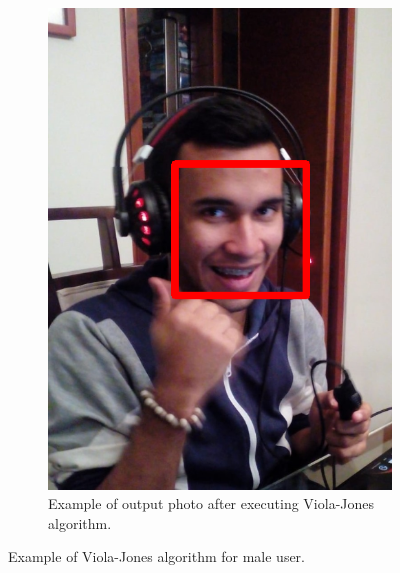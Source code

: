 \documentclass[11pt]{report} %
\begin{document}
\begin{figure}[H]
\begin{subfigure}{.5\textwidth}
		\includegraphics[width=0.8\linewidth]{assets/imgs/computer_vision/computer_vision_elkin_detected.png}
		\caption{Example of output photo after executing Viola-Jones algorithm.}
		\label{fig_detected_elkin}
	\end{subfigure}%
	\caption{Example of Viola-Jones algorithm for male user.}
	\label{fig_detecting_elkin}
\end{figure}
\end{document}
